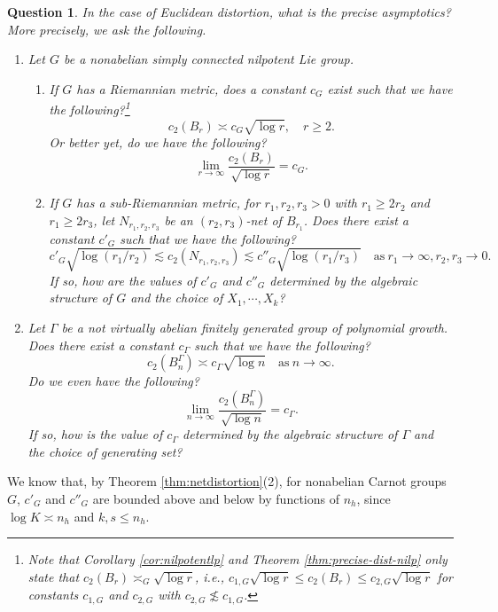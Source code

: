 \documentclass[11pt,reqno]{amsart}
\newtheorem{question}[theorem]{Question}
\newcommand{\1}{\mathbf 1}
\begin{document}
\begin{question}
In the case of Euclidean distortion, what is the precise asymptotics? More precisely, we ask the following.
\begin{enumerate}
\item
Let $G$ be a nonabelian simply connected nilpotent Lie group. 
\begin{enumerate}
	\item If $G$ has a Riemannian metric, does a constant $c_G$ exist such that we have the following?\footnote{Note that Corollary \ref{cor:nilpotentlp} and Theorem \ref{thm:precise-dist-nilp} only state that $c_2\left(B_r\right)\asymp_G \sqrt{\log r}$, i.e., $c_{1,G}\sqrt{\log r}\le c_2\left(B_r\right)\le c_{2,G}\sqrt{\log r}$ for constants $c_{1,G}$ and $c_{2,G}$ with $c_{2,G}\not\lesssim c_{1,G}$.}
	\[
	c_2\left(B_r\right)\asymp c_G\sqrt{\log r},\quad r\ge 2.
	\]
	Or better yet, do we have the following?
	\[
	\lim_{r\to\infty}\frac{c_2\left(B_r\right)}{\sqrt{\log r}}=c_G.
	\]
	\item If $G$ has a sub-Riemannian metric, for $r_1,r_2,r_3>0$ with $r_1\ge 2r_2$ and $r_1\ge 2r_3$, let $N_{r_1,r_2,r_3}$ be an $\left(r_2,r_3\right)$-net of $B_{r_1}$. Does there exist a constant $c'_G$ such that we have the following?
	\[
	c'_G \sqrt{\log \left(r_1/r_2\right)} \lesssim c_2\left(N_{r_1,r_2,r_3}\right)\lesssim c''_G \sqrt{\log \left(r_1/r_3\right)}\quad \mathrm{as}~r_1\to\infty,r_2,r_3\to 0.
	\]
	If so, how are the values of $c'_G$ and $c''_G$ determined by the algebraic structure of $G$ and the choice of $X_1,\cdots,X_k$?
\end{enumerate}



\item
Let $\Gamma$ be a not virtually abelian finitely generated group of polynomial growth. Does there exist a constant $c_\Gamma$ such that we have the following?
\[
c_2\left(B_n^\Gamma\right)\asymp c_\Gamma \sqrt{\log n}\quad \mathrm{as}~n\to\infty.
\]
Do we even have the following?
\[
\lim_{n\to\infty}\frac{c_2\left(B_n^\Gamma\right)}{\sqrt{\log n}}=c_\Gamma.
\]
If so, how is the value of $c_\Gamma$ determined by the algebraic structure of $\Gamma$ and the choice of generating set?
\end{enumerate}
\end{question}

We know that, by Theorem \ref{thm:netdistortion}(2), for nonabelian Carnot groups $G$, $c'_G$ and $c''_G$ are bounded above and below by functions of $n_h$, since $\log K\asymp n_h$ and $k,s\le n_h$.
\end{document}
